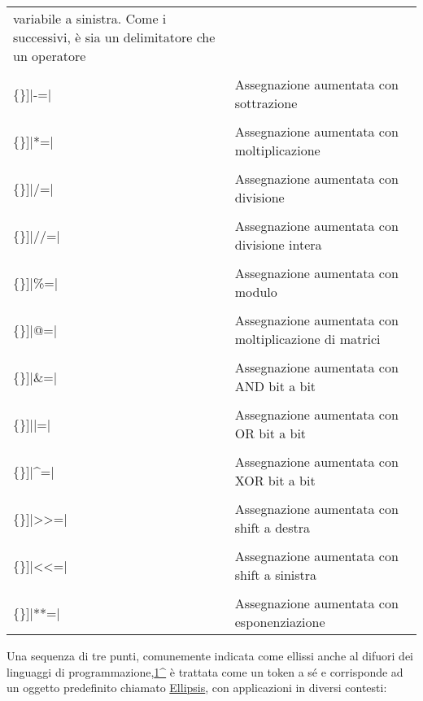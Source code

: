 \documentclass[
  letterpaper,
  DIV=11,
  numbers=noendperiod]{scrreprt}
\newcommand{\VerbBar}{|}
\newcommand{\VERB}{\Verb[commandchars=\\\{\}]}
\newcommand{\OperatorTok}[1]{\textcolor[rgb]{0.37,0.37,0.37}{#1}}
\begin{document}
\begin{longtable}[]{@{}
  >{\raggedright\arraybackslash}p{}
  >{\raggedright\arraybackslash}p{}@{}}
variabile a sinistra. Come i successivi, è sia un delimitatore che un
operatore \\
\VERB|\OperatorTok{{-}=}| & Assegnazione aumentata con sottrazione \\
\VERB|\OperatorTok{*=}| & Assegnazione aumentata con moltiplicazione \\
\VERB|\OperatorTok{/=}| & Assegnazione aumentata con divisione \\
\VERB|\OperatorTok{//=}| & Assegnazione aumentata con divisione
intera \\
\VERB|\OperatorTok{\%=}| & Assegnazione aumentata con modulo \\
\VERB|\OperatorTok{@=}| & Assegnazione aumentata con moltiplicazione di
matrici \\
\VERB|\OperatorTok{\&=}| & Assegnazione aumentata con AND bit a bit \\
\VERB|\OperatorTok{\VerbBar{}=}| & Assegnazione aumentata con OR bit a
bit \\
\VERB|\OperatorTok{\^{}=}| & Assegnazione aumentata con XOR bit a bit \\
\VERB|\OperatorTok{\textgreater{}\textgreater{}=}| & Assegnazione
aumentata con shift a destra \\
\VERB|\OperatorTok{\textless{}\textless{}=}| & Assegnazione aumentata
con shift a sinistra \\
\VERB|\OperatorTok{**=}| & Assegnazione aumentata con esponenziazione \\
\end{longtable}

Una sequenza di tre punti, comunemente indicata come ellissi anche al
difuori dei linguaggi di
programmazione,\href{L'ellissi\%20è\%20usata,\%20ad\%20esempio,\%20in\%20C\%20per\%20dichiarare\%20funzioni\%20che\%20accettano\%20un\%20numero\%20variaible\%20di\%20parametri\%20e\%20i\%20Javascript\%20come\%20operatore\%20per\%20espandere\%20gli\%20array\%20o\%20le\%20proprietà\%20di\%20un\%20oggetto.}{1\^{}}
è trattata come un token a sé e corrisponde ad un oggetto predefinito
chiamato
\href{https://docs.python.org/3/reference/datamodel.html\#ellipsis}{Ellipsis},
con applicazioni in diversi contesti:
\end{document}

